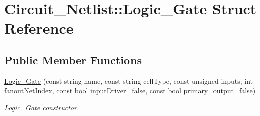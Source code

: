 \hypertarget{structCircuit__Netlist_1_1Logic__Gate}{\section{Circuit\-\_\-\-Netlist\-:\-:Logic\-\_\-\-Gate Struct Reference}
\label{structCircuit__Netlist_1_1Logic__Gate}
}
\subsection*{Public Member Functions}
\begin{DoxyCompactItemize}
\item 
\hyperlink{structCircuit__Netlist_1_1Logic__Gate_a81569a5c27c575b1725c5da2c2090f54}{Logic\-\_\-\-Gate} (const string name, const string cell\-Type, const unsigned inputs, int fanout\-Net\-Index, const bool input\-Driver=false, const bool primary\-\_\-output=false)
\begin{DoxyCompactList}\small\item\em \hyperlink{structCircuit__Netlist_1_1Logic__Gate}{Logic\-\_\-\-Gate} constructor. \end{DoxyCompactList}\end{DoxyCompactItemize}
